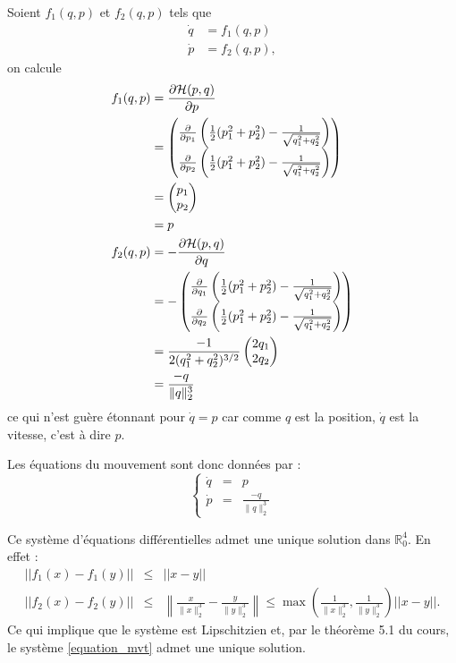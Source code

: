 Soient $f_1(q,p)$ et $f_2(q,p)$ tels que
\begin{align*}
  \dot{q} & = f_1(q,p)\\
  \dot{p} & = f_2(q,p),
\end{align*}
on calcule
\begin{align*}
  f_1(q,p) & =  \fpart{\Ha (p,q)}{p}\\
  & =
  \begin{pmatrix}
    \fpart{}{p_1} \left(\frac{1}{2}(p_1^2 + p_2^2) - \frac{1}{\sqrt{q_1^2 + q_2^2}}\right)\\
    \fpart{}{p_2} \left(\frac{1}{2}(p_1^2 + p_2^2) - \frac{1}{\sqrt{q_1^2 + q_2^2}}\right)
  \end{pmatrix}\\
  & =
  \begin{pmatrix}
    p_1\\
    p_2
  \end{pmatrix}\\
  & = p\\
%
  f_2(q,p) & =  -\fpart{\Ha (p,q)}{q}\\
  & =
  -\begin{pmatrix}
    \fpart{}{q_1} \left(\frac{1}{2}(p_1^2 + p_2^2) - \frac{1}{\sqrt{q_1^2 + q_2^2}}\right)\\
    \fpart{}{q_2} \left(\frac{1}{2}(p_1^2 + p_2^2) - \frac{1}{\sqrt{q_1^2 + q_2^2}}\right)
  \end{pmatrix}\\
  & =
  \frac{-1}{2(q_1^2 + q_2^2)^{3/2}}
  \begin{pmatrix}
    2q_1\\
    2q_2
  \end{pmatrix}\\
  & = \frac{-q}{\|q\|_2^3}
\end{align*}
ce qui n'est guère étonnant pour $\dot{q} = p$ car comme $q$ est la position,
$\dot{q}$ est la vitesse, c'est à dire $p$.

Les équations du mouvement sont donc données par :
\begin{equation} \label{equation_mvt}
\left\lbrace
\begin{array}{ccc}
\dot{q} &=& p\\
\dot{p} &=&  \frac{-q}{\|q\|_2^3}
\end{array}
\right.
\end{equation}

Ce système d'équations différentielles admet une unique solution dans $\mathbb{R}_0^4$. En effet :
\begin{eqnarray}
||f_1(x)-f_1(y)|| &\leq & ||x-y|| \\
||f_2(x) - f_2(y)|| &\leq & \left\|\frac{x}{\|x\|_2^3} - \frac{y}{\|y\|_2^3}\right\| \leq \max(\frac{1}{\|x\|_2^3}, \frac{1}{\|y\|_2^3}) ||x-y||.
\end{eqnarray}
Ce qui implique que le système est Lipschitzien et, par le théorème 5.1 du cours, le système \ref{equation_mvt} admet une unique solution.

